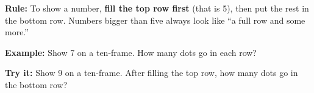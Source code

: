 \documentclass[12pt]{article}
\begin{document}

\begin{formulabox}
\textbf{Rule:} To show a number, \textbf{fill the top row first} (that is 5),
then put the rest in the bottom row. Numbers bigger than five always look like
``a full row and some more.''
\end{formulabox}

\begin{examplebox}
\textbf{Example:} \quad Show 7 on a ten-frame. How many dots go in each row?
\end{examplebox}

\begin{tryitbox}
\textbf{Try it:} \quad Show 9 on a ten-frame. After filling the top row, how
many dots go in the bottom row?\\[2pt]
\end{tryitbox}
\end{document}
